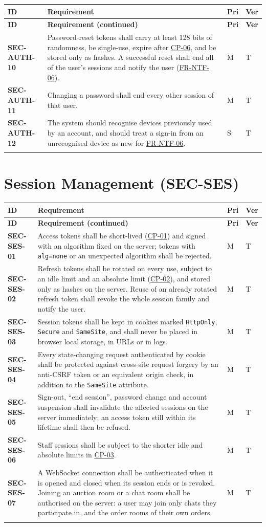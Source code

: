 \documentclass[11pt,a4paper]{report}
\makeatletter
\newenvironment{reqs}{%
  \small
  \begin{longtable}{@{}>{\raggedright\arraybackslash}p{2.35cm}
                       >{\raggedright\arraybackslash}p{10.3cm}
                       >{\centering\arraybackslash}p{0.7cm}
                       >{\centering\arraybackslash}p{0.7cm}@{}}
  \toprule
  \textbf{ID} & \textbf{Requirement} & \textbf{Pri} & \textbf{Ver} \\
  \midrule
  \endfirsthead
  \toprule
  \textbf{ID} & \textbf{Requirement (continued)} & \textbf{Pri} & \textbf{Ver} \\
  \midrule
  \endhead
  \bottomrule
  \endfoot
}{\end{longtable}}
\newcommand{\req}[5]{\leavevmode\textbf{#1}\hypertarget{#1}{} & #5 & #2 & #3 \\ \addlinespace[2pt]}
\newcommand{\rr}[1]{\hyperlink{#1}{#1}}
\newcommand{\cp}[1]{\hyperlink{#1}{#1}}
\makeatother
\begin{document}
\begin{reqs}
\req{SEC-AUTH-10}{M}{T}{new}{Password-reset tokens shall carry at least 128 bits of randomness, be single-use, expire after \cp{CP-06}, and be stored only as hashes. A successful reset shall end all of the user's sessions and notify the user (\rr{FR-NTF-06}).}
\req{SEC-AUTH-11}{M}{T}{new}{Changing a password shall end every other session of that user.}
\req{SEC-AUTH-12}{S}{T}{new}{The system should recognise devices previously used by an account, and should treat a sign-in from an unrecognised device as new for \rr{FR-NTF-06}.}
\end{reqs}

\section{Session Management (SEC-SES)}
\label{sec:sec-ses}
\begin{reqs}
\req{SEC-SES-01}{M}{T}{FR-3}{Access tokens shall be short-lived (\cp{CP-01}) and signed with an algorithm fixed on the server; tokens with \texttt{alg=none} or an unexpected algorithm shall be rejected.}
\req{SEC-SES-02}{M}{T}{FR-3}{Refresh tokens shall be rotated on every use, subject to an idle limit and an absolute limit (\cp{CP-02}), and stored only as hashes on the server. Reuse of an already rotated refresh token shall revoke the whole session family and notify the user.}
\req{SEC-SES-03}{M}{T}{new}{Session tokens shall be kept in cookies marked \texttt{HttpOnly}, \texttt{Secure} and \texttt{SameSite}, and shall never be placed in browser local storage, in URLs or in logs.}
\req{SEC-SES-04}{M}{T}{new}{Every state-changing request authenticated by cookie shall be protected against cross-site request forgery by an anti-CSRF token or an equivalent origin check, in addition to the \texttt{SameSite} attribute.}
\req{SEC-SES-05}{M}{T}{new}{Sign-out, ``end session'', password change and account suspension shall invalidate the affected sessions on the server immediately; an access token still within its lifetime shall then be refused.}
\req{SEC-SES-06}{M}{T}{new}{Staff sessions shall be subject to the shorter idle and absolute limits in \cp{CP-03}.}
\req{SEC-SES-07}{M}{T}{new}{A WebSocket connection shall be authenticated when it is opened and closed when its session ends or is revoked. Joining an auction room or a chat room shall be authorised on the server: a user may join only chats they participate in, and the order rooms of their own orders.}
\end{reqs}
\end{document}
